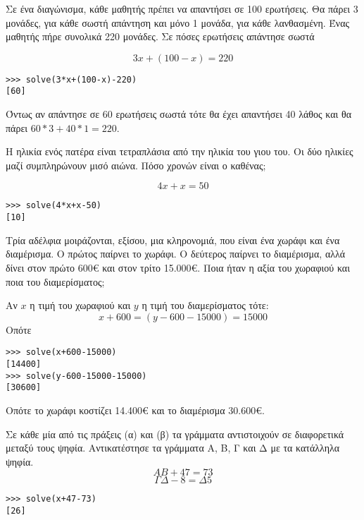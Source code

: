 \begin{exercise}
Σε ένα διαγώνισμα, κάθε μαθητής πρέπει να απαντήσει σε 100 ερωτήσεις. Θα πάρει
3 μονάδες, για κάθε σωστή απάντηση και μόνο 1 μονάδα, για κάθε λανθασμένη. Ένας
μαθητής πήρε συνολικά 220 μονάδες. Σε πόσες ερωτήσεις απάντησε σωστά
\end{exercise}
$$3x+(100-x)=220$$
\begin{lstlisting}
>>> solve(3*x+(100-x)-220)
[60]
\end{lstlisting}
Όντως αν απάντησε σε 60 ερωτήσεις σωστά τότε θα έχει απαντήσει 40 λάθος και θα πάρει $60*3+40*1=220$.

\begin{exercise}
Η ηλικία ενός πατέρα είναι τετραπλάσια από την ηλικία του γιου του. Οι δύο ηλικίες
μαζί συμπληρώνουν μισό αιώνα. Πόσο χρονών είναι ο καθένας;
\end{exercise}
$$4x+x=50$$
\begin{lstlisting}
>>> solve(4*x+x-50)
[10]
\end{lstlisting}
\begin{exercise}
Τρία αδέλφια μοιράζονται, εξίσου, μια κληρονομιά, που είναι ένα χωράφι και ένα
διαμέρισμα. Ο πρώτος παίρνει το χωράφι. Ο δεύτερος παίρνει το διαμέρισμα, αλλά
δίνει στον πρώτο 600€ και στον τρίτο 15.000€. Ποια ήταν η αξία του χωραφιού και
ποια του διαμερίσματος;
\end{exercise}
Αν $x$ η τιμή του χωραφιού και $y$ η τιμή του διαμερίσματος τότε:
$$x+600=(y-600-15000)=15000$$
Οπότε
\begin{lstlisting}
>>> solve(x+600-15000)
[14400]
>>> solve(y-600-15000-15000)
[30600]
\end{lstlisting}
Οπότε το χωράφι κοστίζει 14.400€ και το διαμέρισμα 30.600€.
\begin{exercise}
Σε κάθε μία από τις πράξεις (α) και (β) τα γράμματα αντιστοιχούν
σε διαφορετικά μεταξύ τους ψηφία. Αντικατέστησε τα γράμματα
Α, Β, Γ και Δ με τα κατάλληλα ψηφία.
$$AB+47=73$$
$$\Gamma\Delta-8=\Delta5$$
\end{exercise}
\begin{lstlisting}
>>> solve(x+47-73)
[26]
\end{lstlisting}

